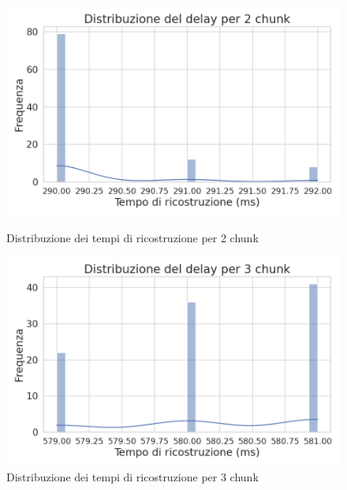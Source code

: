 \documentclass[12pt,a4paper,twoside]{book}
\begin{document}
\begin{figure}[H]
    \centering
    \begin{minipage}{0.47\textwidth}
        \centering
        \includegraphics[width=\textwidth]{img/tests/T2/T2-dist-2chunks.png}
        \caption{Distribuzione dei tempi di ricostruzione per 2 chunk}
        \label{fig:segmentation-test-2chunks}
    \end{minipage}
    \hfill
    \begin{minipage}{0.47\textwidth}
        \centering
        \includegraphics[width=\textwidth]{img/tests/T2/T2-dist-3chunks.png}
        \caption{Distribuzione dei tempi di ricostruzione per 3 chunk}
        \label{fig:segmentation-test-3chunks}
    \end{minipage}

    \vspace{1cm}


\end{figure}
\end{document}

